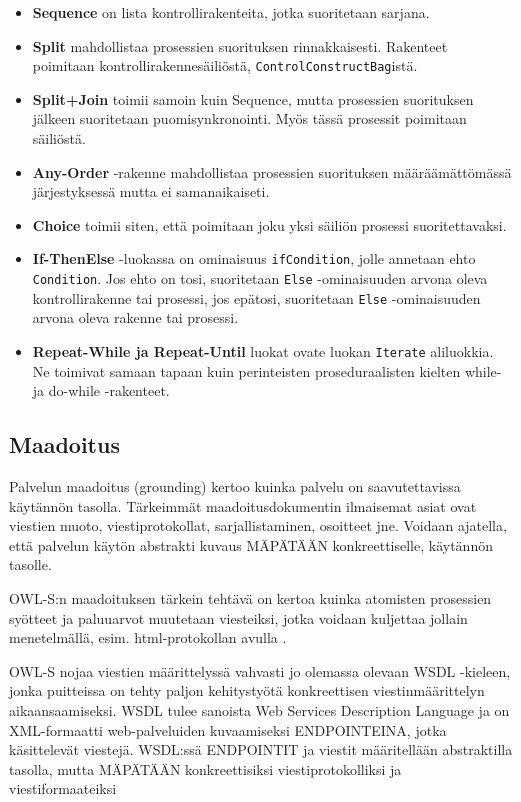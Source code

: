 \documentclass[finnish]{tktltiki2}
\theoremstyle{definition}
\theoremstyle{remark}
\begin{document}
 \begin{itemize}
\item \textbf{Sequence} on lista kontrollirakenteita, jotka suoritetaan sarjana. 
\item \textbf{Split} mahdollistaa prosessien suorituksen rinnakkaisesti. Rakenteet poimitaan kontrollirakennesäiliöstä, \texttt{ControlConstructBag}istä.
\item \textbf{Split+Join} toimii samoin kuin Sequence, mutta prosessien suorituksen jälkeen suoritetaan puomisynkronointi. Myös tässä prosessit poimitaan säiliöstä. 
\item \textbf{Any-Order} -rakenne mahdollistaa prosessien suorituksen määräämättömässä järjestyksessä mutta ei samanaikaiseti. 
\item \textbf{Choice} toimii siten, että poimitaan joku yksi säiliön prosessi suoritettavaksi.
\item \textbf{If-ThenElse} -luokassa on ominaisuus \texttt{ifCondition}, jolle annetaan ehto \texttt{Condition}. Jos ehto on tosi, suoritetaan \texttt{Else} -ominaisuuden arvona oleva kontrollirakenne tai prosessi, jos epätosi, suoritetaan \texttt{Else} -ominaisuuden arvona oleva rakenne tai prosessi. 
\item \textbf{Repeat-While ja Repeat-Until} luokat ovate luokan \texttt{Iterate} aliluokkia. Ne toimivat samaan tapaan kuin perinteisten proseduraalisten kielten while- ja do-while -rakenteet.   
\end{itemize}

\subsection{Maadoitus}

Palvelun maadoitus (grounding) kertoo kuinka palvelu on saavutettavissa käytännön tasolla. Tärkeimmät maadoitusdokumentin ilmaisemat asiat ovat viestien muoto, viestiprotokollat, sarjallistaminen, osoitteet jne\cite{OWLS}. Voidaan ajatella, että palvelun käytön abstrakti kuvaus MÄPÄTÄÄN  konkreettiselle, käytännön tasolle\cite{OWLS}. 

OWL-S:n maadoituksen tärkein tehtävä on kertoa kuinka atomisten prosessien syötteet ja paluuarvot muutetaan viesteiksi, jotka voidaan kuljettaa jollain menetelmällä, esim. html-protokollan avulla \cite{OWLS}. 

OWL-S nojaa viestien määrittelyssä vahvasti jo olemassa olevaan WSDL -kieleen, jonka puitteissa on tehty paljon kehitystyötä konkreettisen viestinmäärittelyn aikaansaamiseksi. WSDL tulee sanoista Web Services Description Language ja on XML-formaatti web-palveluiden kuvaamiseksi ENDPOINTEINA, jotka käsittelevät viestejä. WSDL:ssä ENDPOINTIT ja viestit määritellään abstraktilla tasolla, mutta MÄPÄTÄÄN konkreettisiksi viestiprotokolliksi ja viestiformaateiksi \cite{WSDL}    
\end{document}
